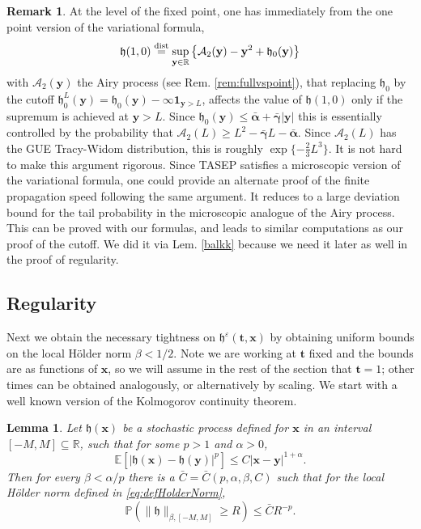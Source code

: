 \documentclass[letterpaper,reqno,11pt,oneside,final]{amsart}
\newtheorem{lem}[thm]{Lemma}
\theoremstyle{definition}
\newtheorem{rem}[thm]{Remark}
\newcommand{\fh}{\mathfrak{h}}
\newcommand{\pp}{\mathbb{P}}
\newcommand{\ee}{\mathbb{E}}
\newcommand{\rr}{\mathbb{R}}
\newcommand{\aip}{\mathcal{A}}
\newcommand{\uno}[1]{\mathbf{1}_{#1}}
\newcommand{\ep}{\varepsilon}
\newcommand{\uptext}[1]{\text{\upshape{#1}}}
\newcommand{\ft}{\mathbf{t}}
\newcommand{\fx}{\mathbf{x}}
\newcommand{\fy}{\mathbf{y}}
\newcommand{\gga}{\bar{\bm{\alpha}}}
\newcommand{\g}{\bar{\bm{\gamma}}}
\numberwithin{equation}{section}
\begin{document}
\begin{rem}\label{rem:airy-var-fps}
At the level of the fixed point, one has immediately from the one point version of the variational formula,
\begin{equation}\label{eq:var2}
\fh(1,0)  \stackrel{\uptext{dist}}{=}  \sup_{\fy\in\rr}\big\{\aip_2(\fy)- \fy^2 + \fh_0(\fy)\big\}
\end{equation} 
with $\aip_2(\fy)$ the Airy process (see Rem. \ref{rem:fullvspoint}), that replacing $ \fh_0$ by the cutoff $ \fh^L_0(\fy) =\fh_0(\fy) - \infty\uno{\fy>L} $,  affects the value of $\fh(1,0)$ only if the supremum is achieved at $\fy>L$.
Since $\fh_0(\fy) \le \gga + \g |\fy|$ this is essentially controlled by the probability that $\aip_2(L)\ge L^2 -\g L -\gga$.
Since $\aip_2(L)$ has the GUE Tracy-Widom distribution, this is roughly $\exp\{-\frac23 L^3\}$.
It is not hard to make this argument rigorous.  
Since TASEP satisfies a microscopic version of the variational formula, one could provide an alternate proof of the finite propagation speed following the same argument.  
It reduces to a large deviation bound for the tail probability in the microscopic analogue of the Airy process.
This can be proved with our formulas, and leads to similar computations as our proof of the cutoff.
We did it via Lem. \ref{balkk} because we need it later as well in the proof of regularity.
\end{rem}

\subsection{Regularity}\label{sec:reg}

Next we obtain the necessary tightness on $\fh^\ep(\ft,\fx)$ by obtaining uniform bounds on the local H\"older norm $\beta<1/2$.  
Note we are working  at $\ft$ fixed and the bounds are as functions of $\fx$, so we will assume in the rest of the section that $\ft=1$; other times can be obtained analogously, or alternatively by scaling.   We start with a well known version of the Kolmogorov continuity 
theorem.

\begin{lem}\label{lem:kolm}  
Let $\fh(\fx)$ be a stochastic process defined for $\fx$ in an interval $[-M,M]\subseteq\rr$, such that for some $p>1$ and $\alpha>0$,
\begin{equation}
\ee\! \left[ \bigl|\fh(\fx)-\fh(\fy)\bigr|^{ p}\right] \le C |\fx-\fy|^{1+\alpha} .\label{eq:hoelder0}
\end{equation}
Then for every $\beta< \alpha/p$ there is a $\bar{C}=\bar{C}(p,\alpha,\beta,C)$  such that for the local H\"older norm defined in \eqref{eq:defHolderNorm},
\begin{equation}\label{holderbd1}
\pp\!\left( \|\fh\|_{\beta, [-M,M]}\ge R \right) \leq \bar CR^{-p}.
\end{equation}
\end{lem}
\end{document}
